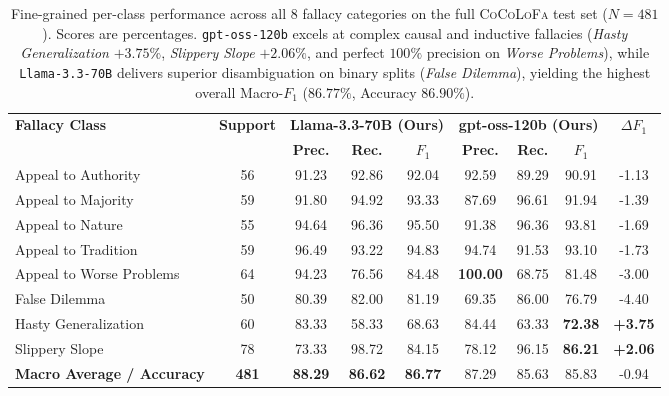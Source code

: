 \documentclass[11pt]{article}
\begin{document}
\begin{table}[t]
\centering
\small
\begin{tabular}{lcccccccc}
\toprule
\multirow{2}{*}{\textbf{Fallacy Class}} & \multirow{2}{*}{\textbf{Support}} & \multicolumn{3}{c}{\textbf{Llama-3.3-70B (Ours)}} & \multicolumn{3}{c}{\textbf{gpt-oss-120b (Ours)}} & \multirow{2}{*}{\textbf{$\Delta F_1$}} \\
\cmidrule(lr){3-5} \cmidrule(lr){6-8}
& & \textbf{Prec.} & \textbf{Rec.} & \textbf{$F_1$} & \textbf{Prec.} & \textbf{Rec.} & \textbf{$F_1$} & \\
\midrule
Appeal to Authority      & 56 & 91.23 & 92.86 & 92.04 & 92.59 & 89.29 & 90.91 & -1.13 \\
Appeal to Majority       & 59 & 91.80 & 94.92 & 93.33 & 87.69 & 96.61 & 91.94 & -1.39 \\
Appeal to Nature         & 55 & 94.64 & 96.36 & 95.50 & 91.38 & 96.36 & 93.81 & -1.69 \\
Appeal to Tradition      & 59 & 96.49 & 93.22 & 94.83 & 94.74 & 91.53 & 93.10 & -1.73 \\
Appeal to Worse Problems & 64 & 94.23 & 76.56 & 84.48 & \textbf{100.00} & 68.75 & 81.48 & -3.00 \\
False Dilemma            & 50 & 80.39 & 82.00 & 81.19 & 69.35 & 86.00 & 76.79 & -4.40 \\
Hasty Generalization     & 60 & 83.33 & 58.33 & 68.63 & 84.44 & 63.33 & \textbf{72.38} & \textbf{+3.75} \\
Slippery Slope           & 78 & 73.33 & 98.72 & 84.15 & 78.12 & 96.15 & \textbf{86.21} & \textbf{+2.06} \\
\midrule
\textbf{Macro Average / Accuracy} & \textbf{481} & \textbf{88.29} & \textbf{86.62} & \textbf{86.77} & 87.29 & 85.63 & 85.83 & -0.94 \\
\bottomrule
\end{tabular}
\caption{Fine-grained per-class performance across all 8 fallacy categories on the full \textsc{CoCoLoFa} test set ($N=481$). Scores are percentages. \texttt{gpt-oss-120b} excels at complex causal and inductive fallacies (\textit{Hasty Generalization} $+3.75\%$, \textit{Slippery Slope} $+2.06\%$, and perfect $100\%$ precision on \textit{Worse Problems}), while \texttt{Llama-3.3-70B} delivers superior disambiguation on binary splits (\textit{False Dilemma}), yielding the highest overall Macro-$F_1$ ($86.77\%$, Accuracy $86.90\%$).}
\label{tab:per_class_test_results}
\end{table}
\end{document}
